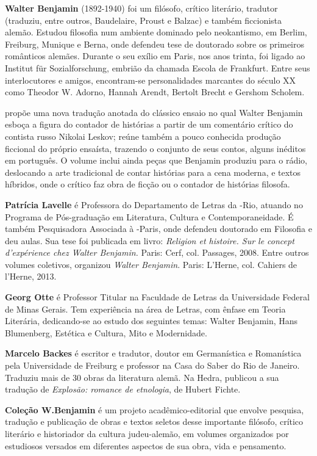 
\textbf{Walter Benjamin} (1892-1940) foi um filósofo, crítico literário, tradutor (traduziu, entre outros, Baudelaire, Proust e Balzac) e também ficcionista alemão. Estudou filosofia num ambiente dominado pelo neokantismo, em Berlim, Freiburg, Munique e Berna, onde defendeu tese de doutorado sobre os primeiros românticos alemães. Durante o seu exílio em Paris, nos anos trinta, foi ligado ao Institut für Sozialforschung, embrião da chamada Escola de Frankfurt. Entre seus interlocutores e amigos, encontram-se personalidades marcantes do século XX como Theodor W. Adorno, Hannah Arendt, Bertolt Brecht e Gershom Scholem.

\textbf{\titulo} propõe uma nova tradução anotada do clássico ensaio no qual Walter Benjamin esboça a figura do contador de histórias a partir de um comentário crítico do contista russo Nikolai Leskov; reúne também a pouco conhecida produção ficcional do próprio ensaísta, trazendo o conjunto de seus contos, alguns inéditos em português. O volume inclui ainda peças que Benjamin produziu para o rádio, deslocando a arte tradicional de contar histórias para a cena moderna, e textos híbridos, onde o crítico faz obra de ficção ou o contador de histórias filosofa.

\textbf{Patrícia Lavelle} é Professora do Departamento de Letras da -Rio, atuando no Programa de Pós-graduação em Literatura, Cultura e Contemporaneidade. É também Pesquisadora Associada à -Paris, onde defendeu doutorado em Filosofia e deu aulas. Sua tese foi publicada em livro: \emph{Religion et histoire. Sur le concept d’expérience chez Walter Benjamin.} Paris: Cerf, col. Passages, 2008. Entre outros volumes coletivos, organizou \emph{Walter Benjamin}. Paris: L’Herne, col. Cahiers de l’Herne, 2013. 

\textbf{Georg Otte} é Professor Titular na Faculdade de Letras da Universidade Federal de Minas Gerais. Tem experiência na área de Letras, com ênfase em Teoria Literária, dedicando-se ao estudo dos seguintes temas: Walter Benjamin, Hans Blumenberg, Estética e Cultura, Mito e Modernidade.

\textbf{Marcelo Backes} é escritor e tradutor, doutor em Germanística e Romanística pela Universidade de Freiburg e professor na Casa do Saber do Rio de Janeiro. Traduziu mais de 30 obras da literatura alemã. Na Hedra, publicou a sua tradução de \emph{Explosão: romance de etnologia}, de Hubert Fichte.

\textbf{Coleção W.Benjamin} é um projeto acadêmico-editorial que envolve pesquisa, tradução e publicação de obras e textos seletos desse importante filósofo, crítico literário e historiador da cultura judeu-alemão, em volumes organizados por estudiosos versados em diferentes aspectos de sua obra, vida e pensamento. 

